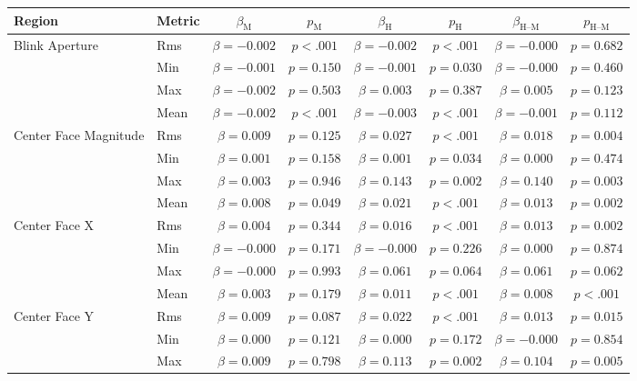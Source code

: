\begin{tabular}{llcc|cc|cc}
\toprule
Region & Metric & $\beta_{\text{M}}$ & $p_{\text{M}}$ & $\beta_{\text{H}}$ & $p_{\text{H}}$ & $\beta_{\text{H--M}}$ & $p_{\text{H--M}}$ \\
\midrule
\multirow{4}{*}{Blink Aperture} & Rms & $\beta = -0.002$ & $p < .001$ & $\beta = -0.002$ & $p < .001$ & $\beta = -0.000$ & $p = 0.682$ \\
 & Min & $\beta = -0.001$ & $p = 0.150$ & $\beta = -0.001$ & $p = 0.030$ & $\beta = -0.000$ & $p = 0.460$ \\
 & Max & $\beta = -0.002$ & $p = 0.503$ & $\beta = 0.003$ & $p = 0.387$ & $\beta = 0.005$ & $p = 0.123$ \\
 & Mean & $\beta = -0.002$ & $p < .001$ & $\beta = -0.003$ & $p < .001$ & $\beta = -0.001$ & $p = 0.112$ \\
\midrule
\multirow{4}{*}{Center Face Magnitude} & Rms & $\beta = 0.009$ & $p = 0.125$ & $\beta = 0.027$ & $p < .001$ & $\beta = 0.018$ & $p = 0.004$ \\
 & Min & $\beta = 0.001$ & $p = 0.158$ & $\beta = 0.001$ & $p = 0.034$ & $\beta = 0.000$ & $p = 0.474$ \\
 & Max & $\beta = 0.003$ & $p = 0.946$ & $\beta = 0.143$ & $p = 0.002$ & $\beta = 0.140$ & $p = 0.003$ \\
 & Mean & $\beta = 0.008$ & $p = 0.049$ & $\beta = 0.021$ & $p < .001$ & $\beta = 0.013$ & $p = 0.002$ \\
\midrule
\multirow{4}{*}{Center Face X} & Rms & $\beta = 0.004$ & $p = 0.344$ & $\beta = 0.016$ & $p < .001$ & $\beta = 0.013$ & $p = 0.002$ \\
 & Min & $\beta = -0.000$ & $p = 0.171$ & $\beta = -0.000$ & $p = 0.226$ & $\beta = 0.000$ & $p = 0.874$ \\
 & Max & $\beta = -0.000$ & $p = 0.993$ & $\beta = 0.061$ & $p = 0.064$ & $\beta = 0.061$ & $p = 0.062$ \\
 & Mean & $\beta = 0.003$ & $p = 0.179$ & $\beta = 0.011$ & $p < .001$ & $\beta = 0.008$ & $p < .001$ \\
\midrule
\multirow{4}{*}{Center Face Y} & Rms & $\beta = 0.009$ & $p = 0.087$ & $\beta = 0.022$ & $p < .001$ & $\beta = 0.013$ & $p = 0.015$ \\
 & Min & $\beta = 0.000$ & $p = 0.121$ & $\beta = 0.000$ & $p = 0.172$ & $\beta = -0.000$ & $p = 0.854$ \\
 & Max & $\beta = 0.009$ & $p = 0.798$ & $\beta = 0.113$ & $p = 0.002$ & $\beta = 0.104$ & $p = 0.005$ \\

\end{tabular}

